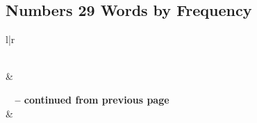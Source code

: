 

\subsection{Numbers 29 Words by Frequency}


\normalsize
 
\begin{center}
\begin{longtable}{l|r}
\caption[Numbers 29 Words by Frequency]{Numbers 29 Words by Frequency}\label{table:WordsbyFrequency for Numbers 29} \\
\hline {} &  \\ \hline 
\endfirsthead
 
{{\bfseries \tablename\ \thetable{} -- continued from previous page}} \\  
\hline {} &  \\ \hline 
\endhead
 

\end{longtable}
\end{center}

